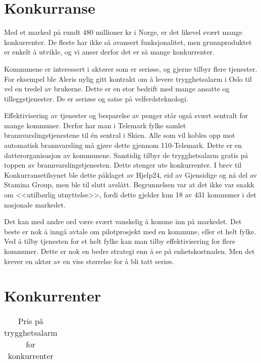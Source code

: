 

\section{Konkurranse}

Med et marked på rundt 480 millioner kr i Norge, er det likevel svært mange
konkurrenter. De fleste har ikke så avansert funksjonalitet, men grunnproduktet
er enkelt å utvikle, og vi anser derfor det er så mange konkurrenter.

Kommunene er interessert i aktører som er seriøse, og gjerne tilbyr flere
tjenester. For eksempel ble Aleris nylig gitt kontrakt om å levere
trygghetsalarm i Oslo \cite{telenor.aleris} til vel en tredel av brukerne.
Dette er en stor bedrift med mange ansatte og tilleggstjenester. De er seriøse
og satse på velferdsteknologi.

Effektivisering av tjenester og besparelse av penger står også svært sentralt
for mange kommuner. Derfor har man i Telemark fylke samlet
brannvarslingstjenestene til én sentral i Skien. Alle som vil kobles opp mot
automatisk brannvarsling må gjøre dette gjennom 110-Telemark. Dette er en
datterorganisasjon av kommunene. Samtidig tilbyr de trygghetsalarm gratis på
toppen av brannvarslingstjenesten. Dette stenger ute konkurrenter. I brev til
Konkurransetilsynet \cite{telemark.konkurransetilsyn} ble dette påklaget av
Hjelp24, eid av Gjensidige og nå del av Stamina Group, men ble til slutt
avslått. Begrunnelsen var at det ikke var snakk om <<utilbørlig utnyttelse>>,
fordi dette gjelder kun 18 av 431 kommuner i det nasjonale markedet.

Det kan med andre ord være svært vanskelig å komme inn på markedet. Det beste
er nok å inngå avtale om pilotprosjekt med en kommune, eller et helt fylke. Ved
å tilby tjenesten for et helt fylke kan man tilby effektivisering for flere
kommuner. Dette er nok en bedre strategi enn å se på enhetskostnaden. Men det
krever en aktør av en viss størrelse for å bli tatt seriøs.

\section{Konkurrenter}

\begin{table}
  \begin{tabular}{l}
  \end{tabular}
  \caption{Pris på trygghetsalarm for konkurrenter}
  \label{table.konkurrenter.pris}
\end{table}

